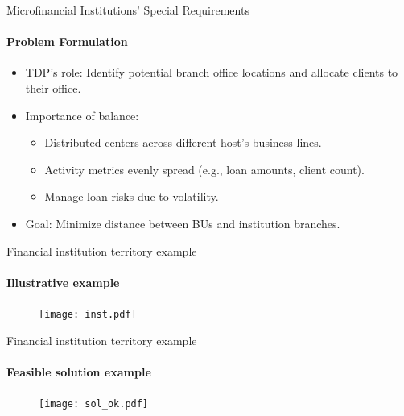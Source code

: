 \documentclass{beamer}
\begin{document}
\begin{frame}{Microfinancial Institutions' Special Requirements}
    \framesubtitle{Problem Formulation}
    \begin{itemize}
        \item TDP's role: Identify potential branch office locations and allocate clients to their office.
        \item Importance of balance:
        \begin{itemize}
            \item Distributed centers across different host's business lines.
            \item Activity metrics evenly spread (e.g., loan amounts, client count).
            \item Manage loan risks due to volatility.
        \end{itemize}
        \item Goal: Minimize distance between BUs and institution branches.
    \end{itemize}
\end{frame}

\begin{frame}{Financial institution territory example}
    \framesubtitle{Illustrative example}
    \begin{figure}
        \centering
        \texttt{[image: inst.pdf]}
        \label{fig:instancia}
    \end{figure}
\end{frame}

\begin{frame}{Financial institution territory example}
    \framesubtitle{Feasible solution example}
    \begin{figure}
        \centering
        \texttt{[image: sol\_ok.pdf]}
        \label{fig:instancia}
    \end{figure}
\end{frame}
\end{document}

